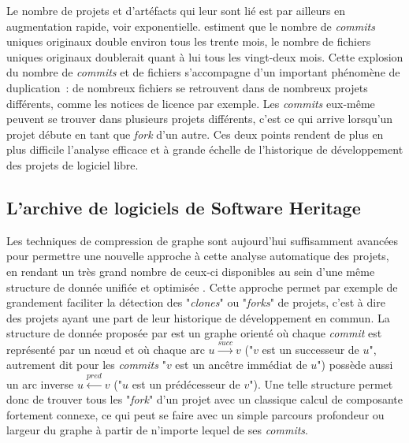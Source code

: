 \documentclass[dvipsnames]{llncs}
\newcommand{\en}[1]{\foreignlanguage{english}{\emph{#1}}}
\begin{document}
    Le nombre de projets et d'artéfacts qui leur sont lié est par ailleurs en augmentation rapide, voir
    exponentielle. \textcite{swh-growth-2019} estiment que le nombre de \en{commits} uniques originaux double
    environ tous les trente mois, le nombre de fichiers uniques originaux doublerait quant à lui tous les
    vingt-deux mois. Cette explosion du nombre de \en{commits} et de fichiers s'accompagne d'un important
    phénomène de duplication : de nombreux fichiers se retrouvent dans de nombreux projets différents, comme
    les notices de licence par exemple. Les \en{commits} eux-même peuvent se trouver dans plusieurs projets
    différents, c'est ce qui arrive lorsqu'un projet débute en tant que \en{fork} d'un autre. Ces deux points
    rendent de plus en plus difficile l'analyse efficace et à grande échelle de l'historique de développement
    des projets de logiciel libre.

    \subsection{L'archive de logiciels de Software Heritage}

    \label{ssec:swh-graph}

    Les techniques de compression de graphe sont aujourd'hui suffisamment avancées pour permettre une nouvelle
    approche à cette analyse automatique des projets, en rendant un très grand nombre de ceux-ci disponibles
    au sein d'une même structure de donnée unifiée et optimisée \parencite{swh-graph-2020}. Cette approche
    permet par exemple de grandement faciliter la détection des "\en{clones}" ou "\en{forks}" de projets,
    c'est à dire des projets ayant une part de leur historique de développement en commun. La structure de
    donnée proposée par \textcite{swh-graph-2020} est un graphe orienté où chaque \en{commit} est représenté
    par un nœud et où chaque arc $u \xrightarrow{succ} v$ ("$v$ est un successeur de $u$", autrement dit pour
    les \en{commits} "$v$ est un ancêtre immédiat de $u$") possède aussi un arc inverse $u \xleftarrow{pred}
    v$ ("$u$ est un prédécesseur de $v$"). Une telle structure permet donc de trouver tous les "\en{fork}"
    d'un projet avec un classique calcul de composante fortement connexe, ce qui peut se faire avec un simple
    parcours profondeur ou largeur du graphe à partir de n'importe lequel de ses \en{commits}.
\end{document}
